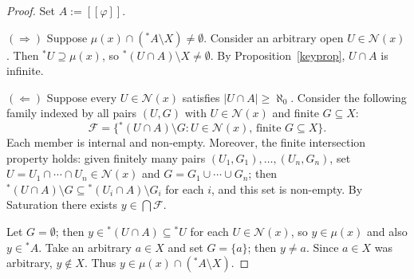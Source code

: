 \documentclass[submission,copyright,creativecommons]{eptcs}
\newcommand{\sem}[1]{[\![#1]\!]}
\newcommand{\str}{{{}^{*}\!}}
\begin{document}
\begin{proof}
Set $A := \sem{\varphi}$.

$(\Rightarrow)$ Suppose $\mu(x) \cap (\str A \setminus X) \neq \emptyset$.
Consider an arbitrary open $U \in \mathcal{N}(x)$.
Then $\str U \supseteq \mu(x)$, so $\str(U \cap A) \setminus X \neq \emptyset$. 
By Proposition~\ref{keyprop}, $U \cap A$ is infinite.

$(\Leftarrow)$ Suppose every $U \in \mathcal{N}(x)$ satisfies $|U \cap A|\geq \aleph_0$.
Consider the following family indexed by all pairs $(U, G)$ with $U \in \mathcal{N}(x)$
and finite $G \subseteq X$:
\[
  \mathcal{F}
  = \bigl\{{}^*(U \cap A) \setminus G :
     U \in \mathcal{N}(x),\, \text{finite } G \subseteq X\bigr\}.
\]
Each member is internal and non-empty. 
Moreover, the finite intersection property holds: given finitely many pairs
$(U_1, G_1), \ldots, (U_n, G_n)$, set $U = U_1 \cap \cdots \cap U_n
\in \mathcal{N}(x)$ and $G = G_1 \cup \cdots \cup G_n$; then
${}^*(U \cap A) \setminus G \subseteq {}^*(U_i \cap A) \setminus G_i$
for each $i$, and this set is non-empty.
By Saturation there exists $y \in \bigcap \mathcal{F}$.

Let $G = \emptyset$; then $y \in \str(U \cap A) \subseteq \str U$ for each $U \in \mathcal{N}(x)$, so $y \in \mu(x)$ and also $y \in \str A$.
Take an arbitrary $a \in X$ and set $G = \{a\}$; then $y \neq a$.
Since $a \in X$ was arbitrary, $y \notin X$.
Thus $y \in \mu(x) \cap (\str A \setminus X)$.
\end{proof}
\end{document}

